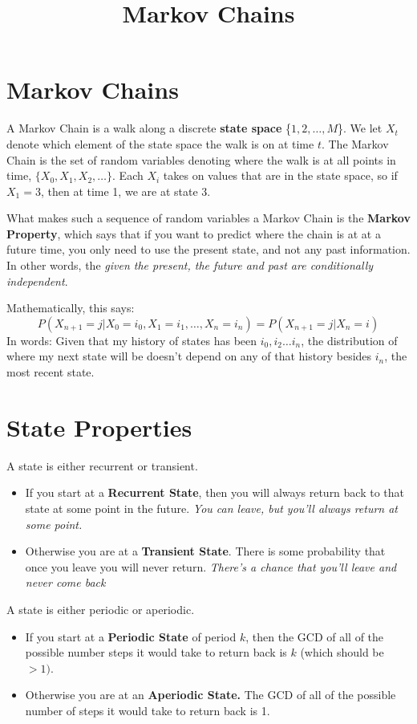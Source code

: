 \documentclass[11.5pt]{article}
\title{Markov Chains}
\author{\justin}
\begin{document}
\maketitle

\begin{notes}

\section*{Markov Chains}
A Markov Chain is a walk along a discrete \textbf{state space} \{$1, 2, \dots, M$\}. We let $X_t$ denote which element of the state space the walk is on at time $t$. The Markov Chain is the set of random variables denoting where the walk is at all points in time, $\{X_0, X_1, X_2, \dots \}$. Each $X_i$ takes on values that are in the state space, so if $X_1 = 3$, then at time 1, we are at state 3. 

What makes such a sequence of random variables a Markov Chain is the \textbf{Markov Property}, which says that if you want to predict where the chain is at at a future time, you only need to use the present state, and not any past information. In other words, the \emph{given the present, the future and past are conditionally independent}. 

Mathematically, this says: 
\[P(X_{n+1} = j | X_0 = i_0, X_1 = i_1, \dots, X_n = i_n) = P(X_{n+1} = j | X_n = i)\]
In words: Given that my history of states has been $i_0, i_2 \ldots i_n$, the distribution of where my next state will be doesn't depend on any of that history besides $i_n$, the most recent state. 
\section*{State Properties}
A state is either recurrent or transient.
\begin{itemize}
\item If you start at a \textbf{Recurrent State}, then you will always return back to that state at some point in the future.  \emph{You can leave, but you'll always return at some point.} 
\item Otherwise you are at a \textbf{Transient State}. There is some probability that once you leave you will never return. \emph{There's a chance that you'll leave and never come back}
\end{itemize}
A state is either periodic or aperiodic.
\begin{itemize}
\item If you start at a \textbf{Periodic State} of period $k$, then the GCD of all of the possible number steps it would take to return back is  $k$ (which should be $> 1)$.
\item Otherwise you are at an \textbf{Aperiodic State.} The GCD of all of the possible number of steps it would take to return back is 1.
\end{itemize}



\end{notes}
\end{document}
